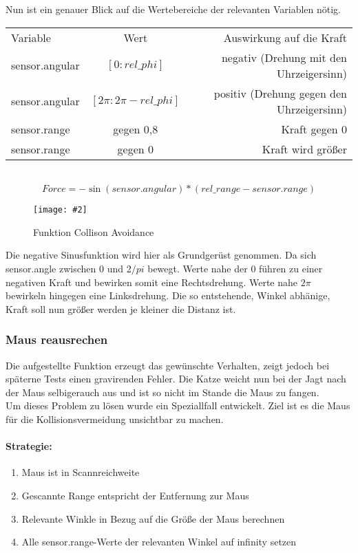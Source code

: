 \documentclass[
a4paper,     %
12pt         %
]{scrartcl}  %
\newcommand{\mygraphics}[3]{
\begin{figure}[!h]
  \begin{center}
    \texttt{[image: \#2]} \\
    \caption{#3}\label{fig:#2}
  \end{center}
\end{figure}

}
\begin{document}
Nun ist ein genauer Blick auf die Wertebereiche der relevanten Variablen nötig.\\

 \begin{tabular}[h]{lcr}
 Variable & Wert & Auswirkung auf die Kraft \\
 sensor.angular & $[0 : rel\_phi]$ & negativ (Drehung mit den Uhrzeigersinn) \\
 sensor.angular & $[2\pi : 2\pi-rel\_phi]$ & positiv (Drehung gegen den Uhrzeigersinn) \\
 sensor.range & gegen 0,8  & Kraft gegen 0 \\
 sensor.range & gegen 0 & Kraft wird größer \\

 \end{tabular}
\\

\[ Force= -\sin(sensor.angular) * (rel\_range-sensor.range) \]
\mygraphics{0.7\textwidth}{Kollision.png}{Funktion Collison Avoidance}
Die negative Sinusfunktion wird hier als Grundgerüst genommen. Da sich sensor.angle zwischen 0 und 2$/pi$ bewegt. Werte nahe der 0 führen zu einer negativen Kraft und bewirken somit eine Rechtsdrehung. Werte nahe $2\pi $ bewirkeln hingegen eine Linksdrehung. Die so entstehende, Winkel abhänige, Kraft soll nun größer werden je kleiner die Distanz ist.


\subsubsection{Maus reausrechen}
Die aufgestellte Funktion erzeugt das gewünschte Verhalten, zeigt jedoch bei späterne Tests einen gravirenden Fehler. Die Katze weicht nun bei der Jagt nach der Maus selbigerauch aus und ist so nicht im Stande die Maus zu fangen. \\
Um dieses Problem zu lösen wurde ein Speziallfall entwickelt.
Ziel ist es die Maus für die Kollisionsvermeidung unsichtbar zu machen. \\
\paragraph{Strategie:}
\begin{enumerate}
\item Maus ist in Scannreichweite
\item Gescannte Range entspricht der Entfernung zur Maus
\item Relevante Winkle in Bezug auf die Größe der Maus berechnen
\item Alle sensor.range-Werte der relevanten Winkel auf infinity setzen
\end{enumerate}
\end{document}
